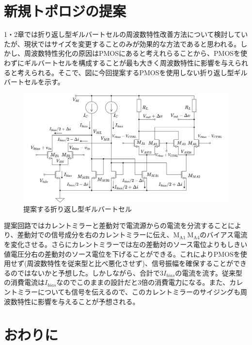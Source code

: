 \documentclass[twocolumn]{jsarticle}
\begin{document}
\section{新規トポロジの提案}
    1・2章では折り返し型ギルバートセルの周波数特性改善方法について検討していたが、現状ではサイズを変更することのみが効果的な方法であると思われる。しかし、周波数特性劣化の原因はPMOSにあると考えれらることから、PMOSを使わずにギルバートセルを構成することが最も大きく周波数特性に影響を与えられると考えられる。そこで、図に今回提案するPMOSを使用しない折り返し型ギルバートセルを示す。
    \begin{figure}[t]
        \begin{center}
            \includegraphics*[width = 160mm]{figures/NtoNFolded.png}
            \caption{提案する折り返し型ギルバートセル}
            \label{fig:NtoN_folded}
        \end{center}
    \end{figure}
    提案回路ではカレントミラーと差動対で電流源からの電流を分流することにより、差動対での信号成分を右のカレントミラーに伝え、$\mathrm{M_{A1}~M_{A4}}$のバイアス電流を変化させる。さらにカレントミラーでは左の差動対のソース電位よりもしきい値電圧分右の差動対のソース電位を下げることができる。これによりPMOSを使用せず(周波数特性を従来型と比べ悪化させず)、信号振幅を確保することができるのではないかと予想した。しかしながら、合計で$3I_{bias}$の電流を流す。従来型の消費電流は$I_{bias}$なのでこのままの設計だと3倍の消費電力になる。また、カレントミラーについても信号を伝えるので、このカレントミラーのサイジングも周波数特性に影響を与えることが予想される。


\section{おわりに}
\end{document}
